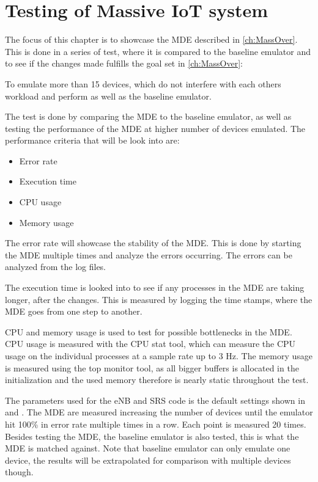 \chapter{Testing of Massive IoT system} \label{ch:mass_test}
The focus of this chapter is to showcase the \gls{MDE} described in \autoref{ch:MassOver}. This is done in a series of test, where it is compared to the baseline emulator and to see if the changes made fulfills the goal set in \autoref{ch:MassOver}:

To emulate more than 15 devices, which do not interfere with each others workload and perform as well as the baseline emulator.


The test is done by comparing the \gls{MDE} to the baseline emulator, as well as testing the performance of the MDE at higher number of devices emulated.
The performance criteria that will be look into are:

\begin{itemize}
\item Error rate
\item Execution time
\item CPU usage
\item Memory usage
\end{itemize}

The error rate will showcase the stability of the MDE. This is done by starting the MDE multiple times and analyze the errors occurring. The errors can be analyzed from the log files.

The execution time is looked into to see if any processes in the MDE are taking longer, after the changes. This is measured by logging the time stamps, where the MDE goes from one step to another. 

CPU and memory usage is used to test for possible bottlenecks in the MDE. CPU usage is measured with the CPU stat tool, which can measure the CPU usage on the individual processes at a sample rate up to 3 Hz. The memory usage is measured using the top monitor tool, as all bigger buffers is allocated in the initialization and the used memory therefore is nearly static throughout the test. 

The parameters used for the eNB and SRS code is the default settings shown in  and . The MDE are measured increasing the number of devices until the emulator hit 100\% in error rate multiple times in a row. Each point is measured 20 times. Besides testing the MDE, the baseline emulator is also tested, this is what the MDE is matched against. Note that baseline emulator can only emulate one device, the results will be extrapolated for comparison with multiple devices though.

